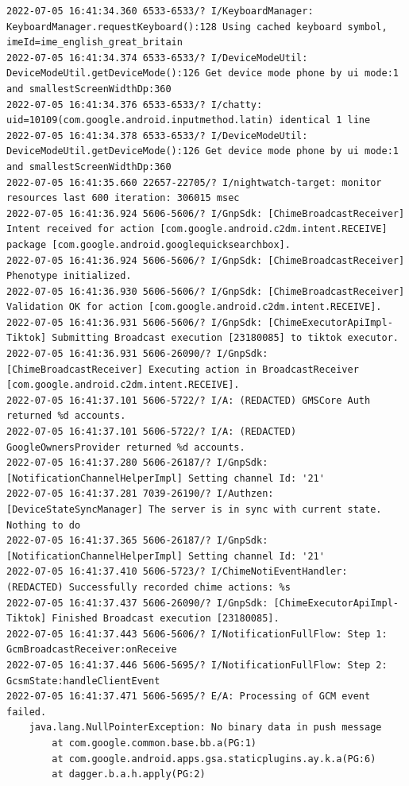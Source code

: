 \documentclass[a4paper,12pt]{book}
\begin{document}
\begin{lstlisting}
2022-07-05 16:41:34.360 6533-6533/? I/KeyboardManager: KeyboardManager.requestKeyboard():128 Using cached keyboard symbol, imeId=ime_english_great_britain
2022-07-05 16:41:34.374 6533-6533/? I/DeviceModeUtil: DeviceModeUtil.getDeviceMode():126 Get device mode phone by ui mode:1 and smallestScreenWidthDp:360
2022-07-05 16:41:34.376 6533-6533/? I/chatty: uid=10109(com.google.android.inputmethod.latin) identical 1 line
2022-07-05 16:41:34.378 6533-6533/? I/DeviceModeUtil: DeviceModeUtil.getDeviceMode():126 Get device mode phone by ui mode:1 and smallestScreenWidthDp:360
2022-07-05 16:41:35.660 22657-22705/? I/nightwatch-target: monitor resources last 600 iteration: 306015 msec
2022-07-05 16:41:36.924 5606-5606/? I/GnpSdk: [ChimeBroadcastReceiver] Intent received for action [com.google.android.c2dm.intent.RECEIVE] package [com.google.android.googlequicksearchbox].
2022-07-05 16:41:36.924 5606-5606/? I/GnpSdk: [ChimeBroadcastReceiver] Phenotype initialized.
2022-07-05 16:41:36.930 5606-5606/? I/GnpSdk: [ChimeBroadcastReceiver] Validation OK for action [com.google.android.c2dm.intent.RECEIVE].
2022-07-05 16:41:36.931 5606-5606/? I/GnpSdk: [ChimeExecutorApiImpl-Tiktok] Submitting Broadcast execution [23180085] to tiktok executor.
2022-07-05 16:41:36.931 5606-26090/? I/GnpSdk: [ChimeBroadcastReceiver] Executing action in BroadcastReceiver [com.google.android.c2dm.intent.RECEIVE].
2022-07-05 16:41:37.101 5606-5722/? I/A: (REDACTED) GMSCore Auth returned %d accounts.
2022-07-05 16:41:37.101 5606-5722/? I/A: (REDACTED) GoogleOwnersProvider returned %d accounts.
2022-07-05 16:41:37.280 5606-26187/? I/GnpSdk: [NotificationChannelHelperImpl] Setting channel Id: '21'
2022-07-05 16:41:37.281 7039-26190/? I/Authzen: [DeviceStateSyncManager] The server is in sync with current state. Nothing to do
2022-07-05 16:41:37.365 5606-26187/? I/GnpSdk: [NotificationChannelHelperImpl] Setting channel Id: '21'
2022-07-05 16:41:37.410 5606-5723/? I/ChimeNotiEventHandler: (REDACTED) Successfully recorded chime actions: %s
2022-07-05 16:41:37.437 5606-26090/? I/GnpSdk: [ChimeExecutorApiImpl-Tiktok] Finished Broadcast execution [23180085].
2022-07-05 16:41:37.443 5606-5606/? I/NotificationFullFlow: Step 1: GcmBroadcastReceiver:onReceive
2022-07-05 16:41:37.446 5606-5695/? I/NotificationFullFlow: Step 2: GcsmState:handleClientEvent
2022-07-05 16:41:37.471 5606-5695/? E/A: Processing of GCM event failed.
    java.lang.NullPointerException: No binary data in push message
        at com.google.common.base.bb.a(PG:1)
        at com.google.android.apps.gsa.staticplugins.ay.k.a(PG:6)
        at dagger.b.a.h.apply(PG:2)

\end{lstlisting}
\end{document}
